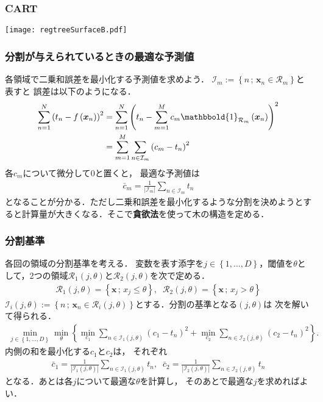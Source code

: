 \documentclass[10pt,hyperref={unicode}]{beamer}
\newcommand{\absolute}[1]{\left|#1\right|}
\newcommand{\parentheses}[1]{\left(#1\right)}
\newcommand{\braces}[1]{\left\{#1\right\}}
\begin{document}
\begin{frame}
\frametitle{CART}
\begin{center}
    \texttt{[image: regtreeSurfaceB.pdf]}
\end{center}
\end{frame}

\begin{frame}
\frametitle{分割が与えられているときの最適な予測値}
各領域で二乗和誤差を最小化する予測値を求めよう．
$\mathcal{I}_m := \braces{n\,;\, \bm{x}_n \in \mathcal{R}_m}$と表すと
誤差は以下のようになる．
\begin{align*}
    \sum_{n = 1}^N \parentheses{t_n - f\parentheses{\bm{x}_n}}^2
    &= \sum_{n = 1}^N \parentheses{%
        t_n - \sum_{m= 1}^M c_m \mathbbold{1}_{\mathcal{R}_m}\parentheses{\bm{x}_n}
    }^2 \\
    &= \sum_{m = 1}^M \sum_{n \in \mathcal{I}_m} \parentheses{%
        c_m - t_n
    }^2
\end{align*}
各$c_m$について微分して$0$と置くと，
最適な予測値は
\begin{align*}
    \bar{c}_m = \frac{1}{\absolute{\mathcal{I}_m}}\sum_{n \in \mathcal{I}_m} t_n
\end{align*}
となることが分かる．ただし二乗和誤差を最小化するような分割を決めようとすると計算量が大きくなる．そこで\textbf{貪欲法}を使って木の構造を定める．
\end{frame}

\begin{frame}
\frametitle{分割基準}
各回の領域の分割基準を考える．
変数を表す添字を$j \in \braces{1,\ldots,D}$，閾値を$\theta$として，2つの領域$\mathcal{R}_1\parentheses{j,\theta}$と$\mathcal{R}_2\parentheses{j,\theta}$を次で定める．
\begin{align*}
    \mathcal{R}_1 \parentheses{j,\theta} = \braces{\bm{x}\,;\, x_j \leq \theta},\;\;
    \mathcal{R}_2 \parentheses{j,\theta} = \braces{\bm{x}\,;\,x_j > \theta}
\end{align*}
$\mathcal{I}_i\parentheses{j,\theta} := \braces{n \,;\,\bm{x}_n \in \mathcal{R}_i\parentheses{j,\theta}}$とする．分割の基準となる$\parentheses{j,\theta}$は
次を解いて得られる．
\begin{align*}
    \min_{j \in \braces{1,\ldots,D}}
    \min_{\theta}
    \braces{%
        \min_{c_1}
        \sum_{n \in \mathcal{I}_1\parentheses{j,\theta}}
        \parentheses{c_1 - t_n}^2 +
        \min_{c_2} \sum_{n \in \mathcal{I}_2\parentheses{j,\theta}}
        \parentheses{c_2 - t_n}^2
    }.
\end{align*}
内側の和を最小化する$c_1$と$c_2$は，
それぞれ
\begin{align*}
    \bar{c}_1 =
        \frac{1}{\absolute{\mathcal{I}_1\parentheses{j,\theta}}}
        \sum_{n \in \mathcal{I}_1\parentheses{j,\theta}} t_n,\;\;
    \bar{c}_2 =
        \frac{1}{\absolute{\mathcal{I}_2\parentheses{j,\theta}}}
        \sum_{n \in \mathcal{I}_2\parentheses{j,\theta}} t_n
\end{align*}
となる．あとは各$j$について最適な$\theta$を計算し，
そのあとで最適な$j$を求めればよい．
\end{frame}
\end{document}
